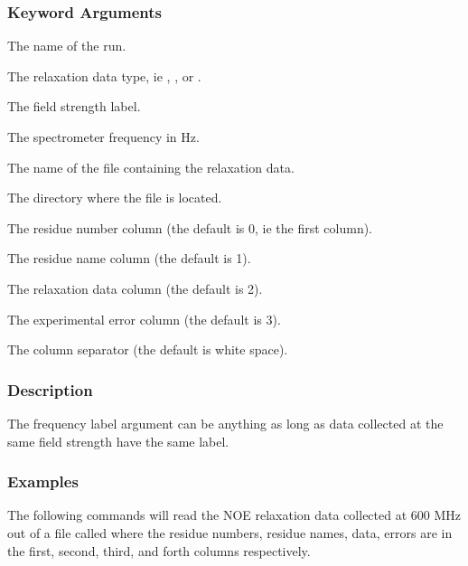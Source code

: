 \subsubsection{Keyword Arguments}


  The name of the run.

  The relaxation  data type, ie 
, 
, or 
.

  The field strength label.

  The spectrometer frequency in Hz.

  The name of the file containing the relaxation  data.

  The directory where the file is located.

  The residue number column (the default is 0, ie the first column).

  The residue name column (the default is 1).

  The relaxation  data column (the default is 2).

  The experimental error column (the default is 3).

  The column separator (the default is white space).

\subsubsection{Description}

The frequency label argument can be anything as long as data collected at the same field
strength have the same label.


\subsubsection{Examples}

The following commands will read  the NOE relaxation  data collected at 600 MHz out of a file
called 
 where the residue numbers, residue names, data, errors are in the
first, second, third, and forth columns respectively.





